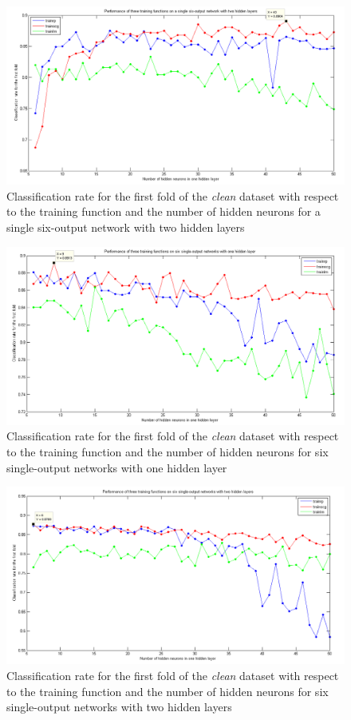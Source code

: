 \documentclass[a4paper]{article}
\begin{document}
\begin{figure}[H]
\center
\includegraphics[width=1\columnwidth]{multiOutput2layer}
\caption{Classification rate for the first fold of the \emph{clean} dataset with respect to the training function and the number of hidden neurons for a single six-output network with two hidden layers}
\label{multiOutput2layer}
\end{figure}

\begin{figure}[H]
\center
\includegraphics[width=1\columnwidth]{singleOutput1layer}
\caption{Classification rate for the first fold of the \emph{clean} dataset with respect to the training function and the number of hidden neurons for six single-output networks with one hidden layer}
\label{singleOutput1layer}
\end{figure}

\begin{figure}[H]
\center
\includegraphics[width=1\columnwidth]{singleOutput2layer}
\caption{Classification rate for the first fold of the \emph{clean} dataset with respect to the training function and the number of hidden neurons for six single-output networks with two hidden layers}
\label{singleOutput2layer}
\end{figure}
\end{document}
